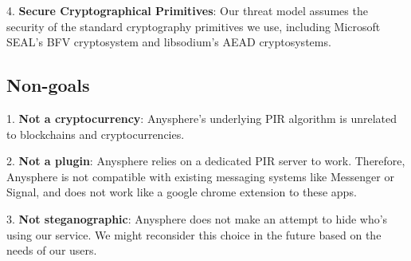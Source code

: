4. \textbf{Secure Cryptographical Primitives}: Our threat model assumes the security of the standard cryptography primitives we use, including Microsoft SEAL's BFV cryptosystem and libsodium's AEAD cryptosystems. 



\subsection{Non-goals}
1. \textbf{Not a cryptocurrency}: Anysphere's underlying PIR algorithm is unrelated to blockchains and cryptocurrencies.

2. \textbf{Not a plugin}: Anysphere relies on a dedicated PIR server to work. Therefore, Anysphere is not compatible with existing messaging systems like Messenger or Signal, and does not work like a google chrome extension to these apps.

3. \textbf{Not steganographic}: Anysphere does not make an attempt to hide who's using our service. We might reconsider this choice in the future based on the needs of our users.

